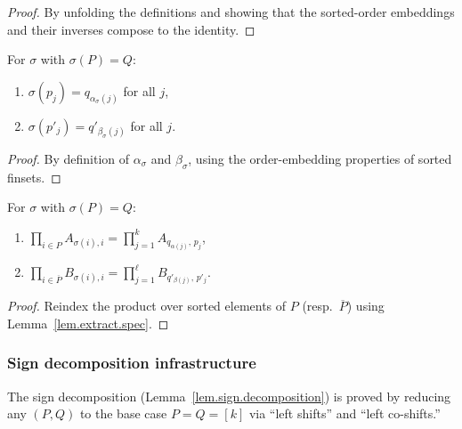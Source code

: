 \begin{proof}
By unfolding the definitions and showing that the sorted-order
embeddings and their inverses compose to the identity.
\end{proof}

\begin{lemma}
\label{lem.extract.spec}
\leanhelper
\leanok
For $\sigma$ with $\sigma(P) = Q$:
\begin{enumerate}
\item $\sigma(p_j) = q_{\alpha_\sigma(j)}$ for all $j$,
\item $\sigma(p'_j) = q'_{\beta_\sigma(j)}$ for all $j$.
\end{enumerate}
\end{lemma}

\begin{proof}
By definition of $\alpha_\sigma$ and $\beta_\sigma$, using the
order-embedding properties of sorted finsets.
\end{proof}

\begin{lemma}
\label{lem.prod.factor}
\leanhelper
\leanok
For $\sigma$ with $\sigma(P) = Q$:
\begin{enumerate}
\item $\displaystyle\prod_{i\in P} A_{\sigma(i),i}
  = \prod_{j=1}^{k} A_{q_{\alpha(j)},\, p_j}$,
\item $\displaystyle\prod_{i\in\overline{P}} B_{\sigma(i),i}
  = \prod_{j=1}^{\ell} B_{q'_{\beta(j)},\, p'_j}$.
\end{enumerate}
\end{lemma}

\begin{proof}
Reindex the product over sorted elements of $P$ (resp.\ $\overline{P}$)
using Lemma~\ref{lem.extract.spec}.
\end{proof}

\subsubsection{Sign decomposition infrastructure}

The sign decomposition (Lemma~\ref{lem.sign.decomposition}) is proved
by reducing any $(P,Q)$ to the base case $P = Q = [k]$ via
``left shifts'' and ``left co-shifts.''

